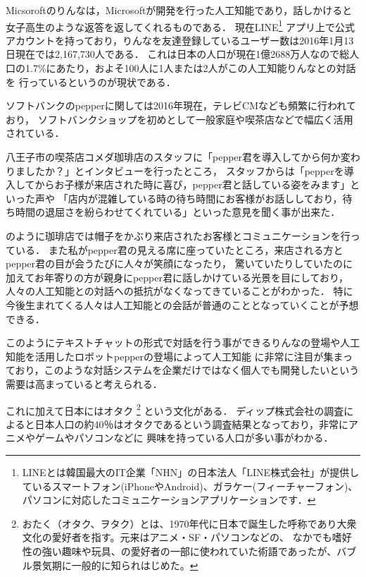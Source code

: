Micsoroftのりんなは，Microsoftが開発を行った人工知能であり，話しかけると女子高生のような返答を返してくれるものである．
現在LINE\footnote{LINEとは韓国最大のIT企業「NHN」の日本法人「LINE株式会社」が提供しているスマートフォン(iPhoneやAndroid)、ガラケー(フィーチャーフォン)、パソコンに対応したコミュニケーションアプリケーションです．\cite{line}}
アプリ上で公式アカウントを持っており，りんなを友達登録しているユーザー数は2016年1月13日現在では2,167,730人である．
これは日本の人口が現在1億2688万人\cite{humen}なので総人口の1.7\%にあたり，およそ100人に1人または2人がこの人工知能りんなとの対話を
行っているというのが現状である．

ソフトバンクのpepperに関しては2016年現在，テレビCMなども頻繁に行われており，
ソフトバンクショップを初めとして一般家庭や喫茶店などで幅広く活用されている．

八王子市の喫茶店コメダ珈琲店\cite{coffe}のスタッフに「pepper君を導入してから何か変わりましたか？」とインタビューを行ったところ，
スタッフからは「pepperを導入してからお子様が来店された時に喜び，pepper君と話している姿をみます」といった声や
「店内が混雑している時の待ち時間にお客様がお話ししており，待ち時間の退屈さを紛らわせてくれている」といった意見を聞く事が出来た．


のように珈琲店では帽子をかぶり来店されたお客様とコミュニケーションを行っている．
また私がpepper君の見える席に座っていたところ，来店される方とpepper君の目が会うたびに人々が笑顔になったり，
驚いていたりしていたのに加えてお年寄りの方が親身にpepper君に話しかけている光景を目にしており，
人々の人工知能との対話への抵抗がなくなってきていることがわかった．
特に今後生まれてくる人々は人工知能との会話が普通のこととなっていくことが予想できる．

このようにテキストチャットの形式で対話を行う事ができるりんなの登場や人工知能を活用したロボットpepperの登場によって人工知能
に非常に注目が集まっており，このような対話システムを企業だけではなく個人でも開発したいという需要は高まっていると考えられる．

これに加えて日本にはオタク
\footnote{おたく（オタク、ヲタク）とは、1970年代に日本で誕生した呼称であり大衆文化の愛好者を指す。元来はアニメ・SF・パソコンなどの、
なかでも嗜好性の強い趣味や玩具、の愛好者の一部に使われていた術語であったが、バブル景気期に一般的に知られはじめた。\cite{ota}}
という文化がある．
ディップ株式会社の調査によると日本人口の約40％はオタクであるという調査結果となっており，非常にアニメやゲームやパソコンなどに
興味を持っている人口が多い事がわかる．

